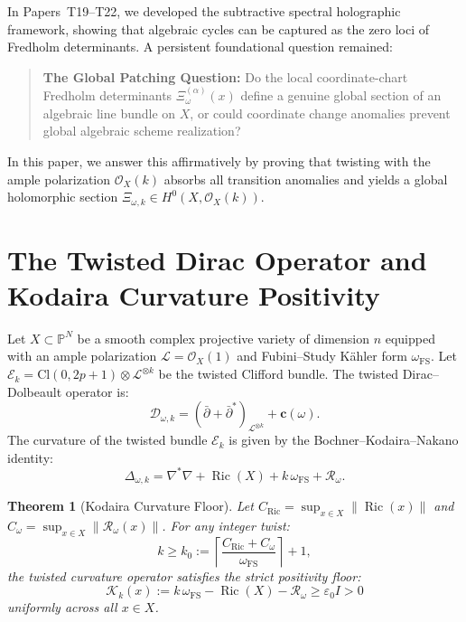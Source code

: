 \documentclass[11pt,a4paper]{article}
\newtheorem{theorem}{Theorem}[section]
\theoremstyle{definition}
\begin{document}
In Papers~T19--T22, we developed the subtractive spectral holographic framework, showing that algebraic cycles can be captured as the zero loci of Fredholm determinants. A persistent foundational question remained:
\begin{quote}
\textbf{The Global Patching Question:} Do the local coordinate-chart Fredholm determinants $\Xi_\omega^{(\alpha)}(x)$ define a genuine global section of an algebraic line bundle on $X$, or could coordinate change anomalies prevent global algebraic scheme realization?
\end{quote}
In this paper, we answer this affirmatively by proving that twisting with the ample polarization $\mathcal{O}_X(k)$ absorbs all transition anomalies and yields a global holomorphic section $\Xi_{\omega, k} \in H^0(X, \mathcal{O}_X(k))$.

\section{The Twisted Dirac Operator and Kodaira Curvature Positivity}

Let $X \subset \mathbb{P}^N$ be a smooth complex projective variety of dimension $n$ equipped with an ample polarization $\mathcal{L} = \mathcal{O}_X(1)$ and Fubini--Study K\"ahler form $\omega_{\mathrm{FS}}$.
Let $\mathcal{E}_k = \mathrm{Cl}(0, 2p+1) \otimes \mathcal{L}^{\otimes k}$ be the twisted Clifford bundle. The twisted Dirac--Dolbeault operator is:
\begin{equation}
  \mathcal{D}_{\omega, k} = (\bar{\partial} + \bar{\partial}^*)_{\mathcal{L}^{\otimes k}} + \mathbf{c}(\omega).
\end{equation}
The curvature of the twisted bundle $\mathcal{E}_k$ is given by the Bochner--Kodaira--Nakano identity:
\begin{equation}
  \Delta_{\omega, k} = \nabla^* \nabla + \operatorname{Ric}(X) + k\,\omega_{\mathrm{FS}} + \mathcal{R}_\omega.
\end{equation}

\begin{theorem}[Kodaira Curvature Floor]
Let $C_{\mathrm{Ric}} = \sup_{x \in X} \|\operatorname{Ric}(x)\|$ and $C_\omega = \sup_{x \in X} \|\mathcal{R}_\omega(x)\|$. For any integer twist:
\begin{equation}
  k \ge k_0 := \left\lceil \frac{C_{\mathrm{Ric}} + C_\omega}{\omega_{\mathrm{FS}}} \right\rceil + 1,
\end{equation}
the twisted curvature operator satisfies the strict positivity floor:
\begin{equation}
  \mathcal{K}_k(x) := k\,\omega_{\mathrm{FS}} - \operatorname{Ric}(X) - \mathcal{R}_\omega \ge \varepsilon_0 I > 0
\end{equation}
uniformly across all $x \in X$.
\end{theorem}
\end{document}
